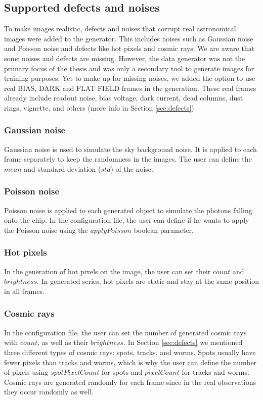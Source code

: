 \subsection{Supported defects and noises}
To make images realistic, defects and noises that corrupt real astronomical images were added to the generator. 
This includes noises such as Gaussian noise and Poisson noise and defects like hot pixels and cosmic rays. We are aware that some noises and defects are missing. However, the data generator was not the primary focus of the thesis and was only a secondary tool to generate images for training purposes. Yet to make up for missing noises, we added the option to use real BIAS, DARK and FLAT FIELD frames in the generation. These real frames already include readout noise, bias voltage, dark current, dead columns, dust rings, vignette, and others (more info in Section \ref{sec:defects}). 

\subsubsection{Gaussian noise}
Gaussian noise is used to simulate the sky background noise. It is applied to each frame separately to keep the randomness in the images. The user can define the $mean$ and standard deviation ($std$) of the noise.

\subsubsection{Poisson noise}
Poisson noise is applied to each generated object to simulate the photons falling onto the chip. In the configuration file, the user can define if he wants to apply the Poisson noise using the $applyPoisson$ boolean parameter. 

\subsubsection{Hot pixels}
In the generation of hot pixels on the image, the user can set their $count$ and $brightness$. In generated series, hot pixels are static and stay at the same position in all frames. 

\subsubsection{Cosmic rays}
In the configuration file, the user can set the number of generated cosmic rays with $count$, as well as their $brightness$. In Section \ref{sec:defects} we mentioned three different types of cosmic rays: spots, tracks, and worms. Spots usually have fewer pixels than tracks and worms, which is why the user can define the number of pixels using $spotPixelCount$ for spots and $pixelCount$ for tracks and worms. Cosmic rays are generated randomly for each frame since in the real observations they occur randomly as well.

